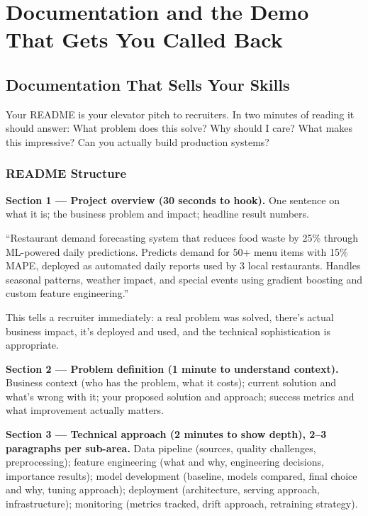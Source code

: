 \chapter{Documentation and the Demo That Gets You Called Back}
\label{ch:projects-c}

\section{Documentation That Sells Your Skills}

\begin{keytakeaway}
Your README is your elevator pitch to recruiters. In two minutes of reading it should answer: What problem does
this solve? Why should I care? What makes this impressive? Can you actually build production systems?
\end{keytakeaway}

\subsection{README Structure}

\textbf{Section 1 --- Project overview (30 seconds to hook).} One sentence on what it is; the business problem and
impact; headline result numbers.

\begin{example}
``Restaurant demand forecasting system that reduces food waste by 25\% through ML-powered daily predictions.
Predicts demand for 50+ menu items with 15\% MAPE, deployed as automated daily reports used by 3 local
restaurants. Handles seasonal patterns, weather impact, and special events using gradient boosting and custom
feature engineering.''

This tells a recruiter immediately: a real problem was solved, there's actual business impact, it's deployed and
used, and the technical sophistication is appropriate.
\end{example}

\textbf{Section 2 --- Problem definition (1 minute to understand context).} Business context (who has the
problem, what it costs); current solution and what's wrong with it; your proposed solution and approach; success
metrics and what improvement actually matters.

\textbf{Section 3 --- Technical approach (2 minutes to show depth), 2--3 paragraphs per sub-area.} Data pipeline
(sources, quality challenges, preprocessing); feature engineering (what and why, engineering decisions,
importance results); model development (baseline, models compared, final choice and why, tuning approach);
deployment (architecture, serving approach, infrastructure); monitoring (metrics tracked, drift approach,
retraining strategy).

